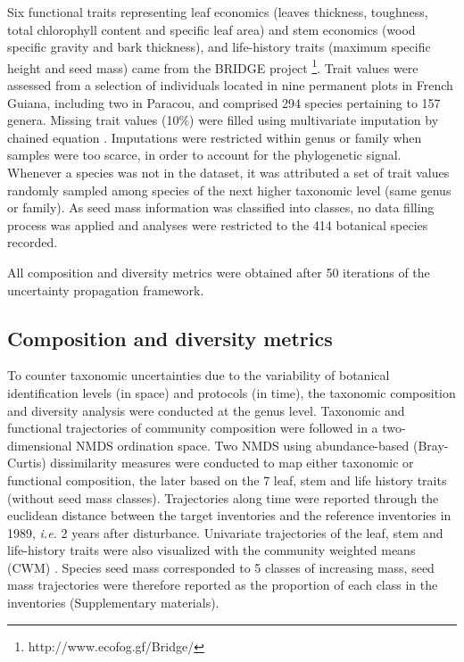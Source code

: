 \documentclass[fleqn,10pt]{ArtEcoFoG} %
\begin{document}
Six functional traits representing leaf economics (leaves thickness,
toughness, total chlorophyll content and specific leaf area) and stem
economics (wood specific gravity and bark thickness), and life-history
traits (maximum specific height and seed mass) came from the BRIDGE
project \footnote{http://www.ecofog.gf/Bridge/}. Trait values were
assessed from a selection of individuals located in nine permanent plots
in French Guiana, including two in Paracou, and comprised 294 species
pertaining to 157 genera. Missing trait values (10\%) were filled using
multivariate imputation by chained equation \citep{Mice2011}.
Imputations were restricted within genus or family when samples were too
scarce, in order to account for the phylogenetic signal. Whenever a
species was not in the dataset, it was attributed a set of trait values
randomly sampled among species of the next higher taxonomic level (same
genus or family). As seed mass information was classified into classes,
no data filling process was applied and analyses were restricted to the
414 botanical species recorded.

All composition and diversity metrics were obtained after 50 iterations
of the uncertainty propagation framework.

\subsection{Composition and diversity
metrics}\label{composition-and-diversity-metrics}

To counter taxonomic uncertainties due to the variability of botanical
identification levels (in space) and protocols (in time), the taxonomic
composition and diversity analysis were conducted at the genus level.
Taxonomic and functional trajectories of community composition were
followed in a two-dimensional NMDS ordination space. Two NMDS using
abundance-based (Bray-Curtis) dissimilarity measures were conducted to
map either taxonomic or functional composition, the later based on the 7
leaf, stem and life history traits (without seed mass classes).
Trajectories along time were reported through the euclidean distance
between the target inventories and the reference inventories in 1989,
\emph{i.e.} 2 years after disturbance. Univariate trajectories of the
leaf, stem and life-history traits were also visualized with the
community weighted means (CWM) \citep{Diaz2007}. Species seed mass
corresponded to 5 classes of increasing mass, seed mass trajectories
were therefore reported as the proportion of each class in the
inventories (Supplementary materials).
\end{document}
